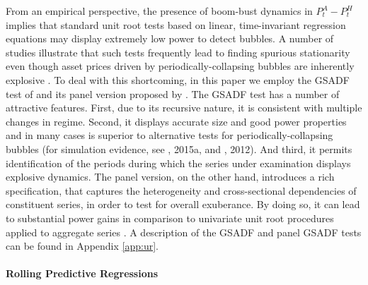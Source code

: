 \documentclass[11pt]{article}
\begin{document}
From an empirical perspective, the presence of boom-bust dynamics in $P_t^A-P_t^H$ implies that standard unit root tests based on linear, time-invariant regression equations may display extremely low power to detect bubbles. A number of studies illustrate that such tests frequently lead to finding spurious stationarity even though asset prices driven by periodically-collapsing bubbles are inherently explosive \citep[see, e.g.,][]{Evans1991}. To deal with this shortcoming, in this paper we employ the GSADF test of \citet{PhillipsSY2015a,PhillipsSY2015b} and its panel version proposed by \citet{pavlidis2016}. The GSADF test has a number of attractive features. First, due to its recursive nature, it is consistent with multiple changes in regime. Second, it displays accurate size and good power properties and in many cases is superior to alternative tests for periodically-collapsing bubbles (for simulation evidence, see \citeauthor{PhillipsSY2015a}, 2015a, and \citeauthor{HommB2012}, 2012). And third, it permits identification of the periods during which the series under examination displays explosive dynamics. The panel version, on the other hand, introduces a rich specification, that captures the heterogeneity and cross-sectional dependencies of constituent series, in order to test for overall exuberance. By doing so, it can lead to substantial power gains in comparison to univariate unit root procedures applied to aggregate series \citep{pavlidisMG2019}. A description of the GSADF and panel GSADF tests can be found in Appendix \ref{app:ur}.


\paragraph{Rolling Predictive Regressions}
\end{document}
